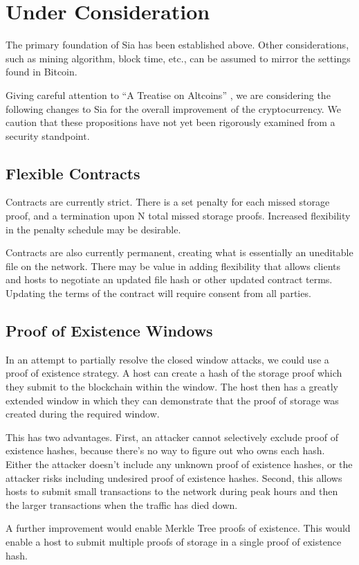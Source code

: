 \documentclass[twocolumn]{article}
\begin{document}
\section{Under Consideration}
The primary foundation of Sia has been established above.
Other considerations, such as mining algorithm, block time, etc., can be assumed to mirror the settings found in Bitcoin.

Giving careful attention to ``A Treatise on Altcoins'' \cite{alts}, we are considering the following changes to Sia for the overall improvement of the cryptocurrency.
We caution that these propositions have not yet been rigorously examined from a security standpoint.

\subsection{Flexible Contracts}
Contracts are currently strict.
There is a set penalty for each missed storage proof, and a termination upon N total missed storage proofs.
Increased flexibility in the penalty schedule may be desirable.

Contracts are also currently permanent, creating what is essentially an uneditable file on the network.
There may be value in adding flexibility that allows clients and hosts to negotiate an updated file hash or other updated contract terms.
Updating the terms of the contract will require consent from all parties.

\subsection{Proof of Existence Windows}
In an attempt to partially resolve the closed window attacks, we could use a proof of existence strategy.
A host can create a hash of the storage proof which they submit to the blockchain within the window.
The host then has a greatly extended window in which they can demonstrate that the proof of storage was created during the required window.

This has two advantages.
First, an attacker cannot selectively exclude proof of existence hashes, because there's no way to figure out who owns each hash.
Either the attacker doesn't include any unknown proof of existence hashes, or the attacker risks including undesired proof of existence hashes.
Second, this allows hosts to submit small transactions to the network during peak hours and then the larger transactions when the traffic has died down.

A further improvement would enable Merkle Tree proofs of existence.
This would enable a host to submit multiple proofs of storage in a single proof of existence hash.
\end{document}
